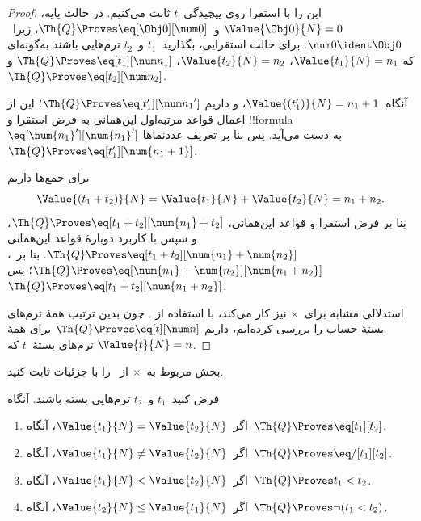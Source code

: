 \documentclass[../../../include/open-logic-section]{subfiles}
\begin{document}
\begin{proof}
این را با استقرا روی پیچیدگی~$t$ ثابت می‌کنیم. در حالت پایه،
$\Value{\Obj 0}{N} = 0$ و~$\Th{Q} \Proves \eq[\Obj 0][\num 0]$،
زیرا~$\num 0 \ident \Obj 0$.
%
برای حالت استقرایی، بگذارید~$t_1$ و~$t_2$ ترم‌هایی باشند به‌گونه‌ای که
$\Value{t_1}{N} = n_1$، $\Value{t_2}{N} = n_2$،
$\Th{Q} \Proves \eq[t_1][\num n_1]$ و
$\Th{Q} \Proves \eq[t_2][\num n_2]$.

آنگاه~$\Value{(t_1')}{N} = n_1 + 1$، و داریم
$\Th{Q} \Proves \eq[t_1'][{\num n_1}']$؛ این از اعمال قواعد
مرتبه‌اول این‌همانی به فرض استقرا و !!{formula}
$\eq[\num{n_1}'][\num{n_1}']$ به دست می‌آید. پس بنا بر تعریف عددنماها
$\Th{Q} \Proves \eq[t_1'][\num{n_1 + 1}]$.

برای جمع‌ها داریم
\[
      \Value{(t_1 + t_2)}{N}
    = \Value{t_1}{N} + \Value{t_2}{N}
    = n_1 + n_2.
\]
بنا بر فرض استقرا و قواعد این‌همانی،
$\Th{Q} \Proves \eq[t_1 + t_2][\num{n_1} + t_2]$، و سپس با کاربرد
دوبارهٔ قواعد این‌همانی
$\Th{Q} \Proves \eq[t_1 + t_2][\num{n_1} + \num{n_2}]$.
بنا بر~،
$\Th{Q} \Proves \eq[\num{n_1} + \num{n_2}][\num{n_1 + n_2}]$؛
پس~$\Th{Q} \Proves \eq[t_1 + t_2][\num{n_1 + n_2}]$.

استدلالی مشابه برای~$\times$ نیز کار می‌کند، با استفاده از
.
%
چون بدین ترتیب همهٔ ترم‌های بستهٔ حساب را بررسی کرده‌ایم، داریم
$\Th{Q} \Proves \eq[t][\num n]$ برای همهٔ ترم‌های بستهٔ~$t$ که
$\Value{t}{N} = n$.
\end{proof}

\begin{prob}
بخش مربوط به~$\times$ از~ را با جزئیات
ثابت کنید.
\end{prob}

\begin{lem}
فرض کنید~$t_1$ و~$t_2$ ترم‌هایی بسته باشند. آنگاه
\begin{enumerate}
\item اگر~$\Value{t_1}{N} = \Value{t_2}{N}$،
    آنگاه~$\Th{Q} \Proves \eq[t_1][t_2]$.
\item اگر~$\Value{t_1}{N} \neq \Value{t_2}{N}$،
    آنگاه~$\Th{Q} \Proves \eq/[t_1][t_2]$.
\item اگر~$\Value{t_1}{N} < \Value{t_2}{N}$،
    آنگاه~$\Th{Q} \Proves t_1 < t_2$.
\item اگر~$\Value{t_2}{N} \leq \Value{t_1}{N}$،
    آنگاه~$\Th{Q} \Proves \lnot(t_1 < t_2)$.
\end{enumerate}
\end{lem}
\end{document}
